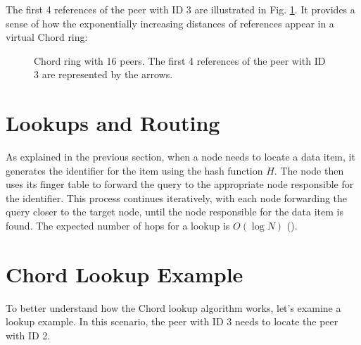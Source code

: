 The first 4 references of the peer with ID 3 are illustrated in Fig. \ref{fig:chord-ring-16-peers-4-references-peer-3}.
It provides a sense of how the exponentially increasing distances of references appear in a virtual Chord ring:

\begin{figure}[htbp]
    \centering
    \caption{Chord ring with 16 peers. The first 4 references of the peer with ID 3 are represented by the arrows.}
    \label{fig:chord-ring-16-peers-4-references-peer-3}
\end{figure}

\section{Lookups and Routing}
As explained in the previous section, when a node needs to locate a data item, it generates the identifier for the item using the hash function $H$.
The node then uses its finger table to forward the query to the appropriate node responsible for the identifier.
This process continues iteratively, with each node forwarding the query closer to the target node, until the node responsible for the data item is found.
The expected number of hops for a lookup is \(O(\log N)\) (\cite{stoica2001}).

\section{Chord Lookup Example}
To better understand how the Chord lookup algorithm works, let's examine a lookup example.
In this scenario, the peer with ID 3 needs to locate the peer with ID 2.

